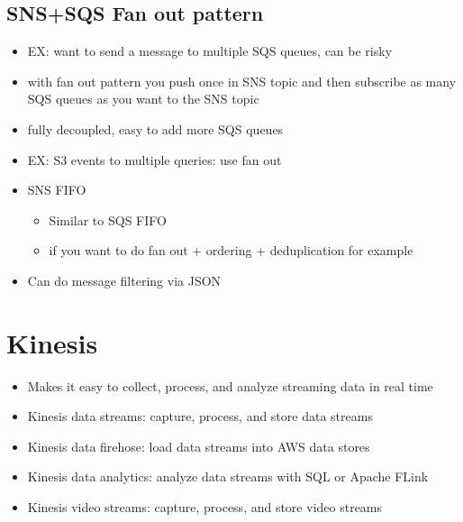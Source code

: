 \documentclass[]{scrartcl}
\begin{document}
\subsection{SNS+SQS Fan out pattern}
\begin{itemize}
	\item EX: want to send a message to multiple SQS queues, can be risky
	\item with fan out pattern you push once in SNS topic and then subscribe as many SQS queues as you want to the SNS topic
	\item fully decoupled, easy to add more SQS queues
	\item EX: S3 events to multiple queries: use fan out
	\item SNS FIFO
	\begin{itemize}
		\item Similar to SQS FIFO
		\item if you want to do fan out + ordering + deduplication for example
	\end{itemize}
	\item Can do message filtering via JSON
\end{itemize}

\section{Kinesis}
\begin{itemize}
	\item Makes it easy to collect, process, and analyze streaming data in real time
	\item Kinesis data streams: capture, process, and store data streams
	\item Kinesis data firehose: load data streams into AWS data stores
	\item Kinesis data analytics: analyze data streams with SQL or Apache FLink
	\item Kinesis video streams: capture, process, and store video streams
\end{itemize}
\end{document}
